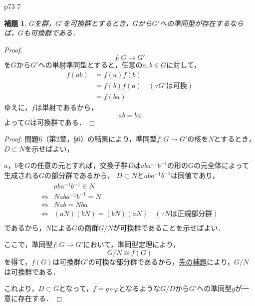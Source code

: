 \documentclass[dvipdfmx,uplatex,11pt]{jsarticle}
\theoremstyle{mytheorem}
\newtheorem{lemm}{補題}[section]
\begin{document}
        \newpage 
        p73 7 
        \begin{lemm}
            \label{lem:p73 7}
            $G$を群，$G'$を可換群とするとき，$G$から$G'$への準同型が存在するならば，$G$も可換群である．
        \end{lemm}

        \begin{proof}
            \[
            f \colon G \longrightarrow G'
            \]
            を$G$から$G'$への単射準同型とすると，任意の$a , b \in G$に対して，
            \begin{align*}
                f(ab)& = f(a)f(b) \\
                & = f(b)f(a) \quad (\because\text{$G'$は可換}) \\
                & = f(ba)
            \end{align*}
            ゆえに，$f$は単射であるから，
            \[
                ab = ba
            \]
            よって$G$は可換群である．
        \end{proof}

        \begin{leftbar}
            \begin{proof}
                問題6（第2章，§6）の結果により，準同型$ f \colon G \longrightarrow G'$の核を$N$とするとき，$D \subset N$を示せばよい，

                $a$，$b$を$G$の任意の元とすれば，交換子群$D$は$aba^{-1}b^{-1}$の形の$G$の元全体によって生成される$G$の部分群であるから，
                $D \subset N$と$aba^{-1}b^{-1}$は同値であり，
                \begin{align*}
                    & aba^{-1}b^{-1} \in N \\
                    \iff & N ab a^{-1}b^{-1} =N \\
                    \iff & Nab = Nba \\
                    \iff & (aN)(bN)=(bN)(aN) \quad (\because \text{$N$は正規部分群}) \\
                \end{align*}
                であるから，$N$による$G$の商群$G / N$が可換群であることを示せばよい．

                ここで，準同型$ f \colon G \longrightarrow G'$において，準同型定理により，
                \[
                    G /N \cong f(G)
                \]
                を得て，$f(G)$は可換群$G'$の可換な部分群であるから，\hyperref[lem:p73 7]{先の補題}により，$G/N$は可換群である．

                これより，$D \subset G$となって，$f =g \circ \varphi$となるような$G /D$から$G'$への準同型$g$が一意に存在する．
            \end{proof}
        \end{leftbar}
        \newpage
\end{document}
